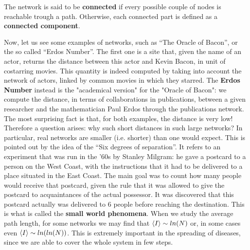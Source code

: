 \documentclass[../main/main.tex]{subfiles}
\begin{document}
The network is said to be \textbf{connected} if every possible couple of nodes is reachable trough a path. Otherwise, each connected part is defined as a \textbf{connected component}.



Now, let us see some examples of networks, such as “The Oracle of Bacon”, or the so called “Erdos Number”. The first one is a site that, given the name of an actor, returns the distance between this actor and Kevin Bacon,  in unit of costarring movies. This quantity is indeed computed by taking into account the network of actors, linked by common movies in which they starred. The \textbf{Erdos Number} instead is the "academical version" for the "Oracle of Bacon": we compute the distance, in terms of collaborations in publications, between a given researcher and the mathematician Paul Erdos through the publications network. The most surprising fact is that, for both examples, the distance is very low! Therefore a question arises: why such short distances in such large networks?
In particular, real networks are smaller (i.e. shorter) than one would expect. This is pointed out by the idea of the “Six degrees of separation”. It refers to an experiment that was run in the '60s by Stanley Milgram: he gave a postcard to a person on the West Coast, with the instructions that it had to be delivered to a place situated in the East Coast. The main goal was to count how many people would receive that postcard, given the rule that it was allowed to give the postcard to acquaintances of the actual possessor. It was discovered that this postcard actually was delivered to 6 people before reaching the destination.
This is what is called the \textbf{small world phenomena}. When we study the average path length, for some networks we may find that $\expval{I} \sim ln(N)$ or, in some cases even $\expval{I} \sim ln(ln(N))$. This is extremely important in the spreading of diseases, since we are able to cover the whole system in few steps.
\end{document}
